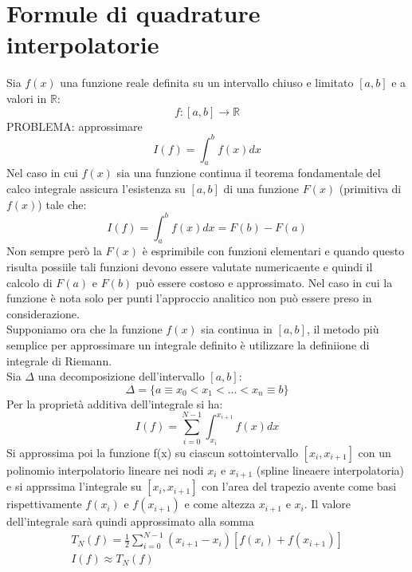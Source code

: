 \documentclass[a4paper, portrait]{book}
\numberwithin{equation}{chapter} %
\begin{document}
\section*{Formule di quadrature interpolatorie}
Sia $f(x)$ una funzione reale definita su un intervallo chiuso e limitato $[a,b]$ e a valori in $\mathbb{R}$:
\begin{equation}
    f: [a,b] \rightarrow \mathbb{R}
\end{equation}
PROBLEMA: approssimare 
\begin{equation}
    I(f) = \int_a^b f(x) dx
\end{equation}
Nel caso in cui $f(x)$ sia una funzione continua il teorema fondamentale del calco integrale assicura l'esistenza su $[a,b]$ di una funzione $F(x)$ (primitiva di $f(x)$) tale che:
\begin{equation}
    I(f) = \int_a^b f(x) dx = F(b) - F(a)
\end{equation}
Non sempre però la $F(x)$ è esprimibile con funzioni elementari e quando questo risulta possiile tali funzioni devono essere valutate numericaente e quindi il calcolo di $F(a)$ e $F(b)$ può essere costoso e approssimato. Nel caso in cui la funzione è nota solo per punti l'approccio analitico non può essere preso in considerazione.\\
Supponiamo ora che la funzione $f(x)$ sia continua in $[a,b]$, il metodo più semplice per approssimare un integrale definito è utilizzare la definiione di integrale di Riemann.\\
Sia $\Delta$ una decomposizione dell'intervallo $[a,b]$:
\begin{equation}
    \Delta = \{a \equiv x_0 < x_1 < ... < x_n \equiv b\}
\end{equation}
Per la proprietà additiva dell'integrale si ha:
\begin{equation}
    I(f) = \sum_{i=0}^{N-1}\int_{x_i}^{x_{i+1}} f(x) dx
\end{equation} 
Si approssima poi la funzione f(x) su ciascun sottointervallo $[x_i,x_{i+1}]$ con un polinomio interpolatorio lineare nei nodi $x_i$ e $x_{i+1}$ (spline lineaere interpolatoria) e si apprssima l'integrale su $[x_i,x_{i+1}]$ con l'area del trapezio avente come basi rispettivamente $f(x_i)$ e $f(x_{i+1})$ e come altezza $x_{i+1}$ e $x_i$. Il valore dell'integrale sarà quindi approssimato alla somma 
\begin{gather}
    T_N(f) = \frac{1}{2}\sum_{i=0}^{N-1}(x_{i+1}-x_i)[f(x_i)+f(x_{i+1})]\\
    I(f) \approx T_N(f)
\end{gather}
\end{document}
